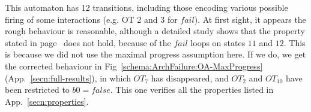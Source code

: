 \documentclass{llncs}
\newcommand{\tupleDeli}{(}
\newcommand{\tupleDelii}{)}
\newcommand{\setTupleDelims}[2][(]{
  \renewcommand{\tupleDeli}{#1}%
  \ifx#2\relax\else\renewcommand{\tupleDelii}{#2}\fi%
}
\newcommand{\tuplebase}[2][\ensuremath{,\allowbreak}]{%
  \def\nextitem{\def\nextitem{#1}}%
  \renewcommand*{\do}[1]{\nextitem ##1}%
  \tupleDeli\docsvlist{#2}\tupleDelii%
}
\newcommand{\tuple}[2][\ensuremath{,\allowbreak}]{%
  \setTupleDelims[(]{)}%
  \tuplebase[#1]{#2}%
}
\newcommand{\listset}[2][\ensuremath{,\allowbreak}]{%
  \setTupleDelims[\{]{\}}%
  \tuplebase[#1]{#2}%
}
\newcommand{\app}[1]{App.~\ref{secn:#1}}
\newcommand{\cC}{\ensuremath{\mathcal{C}}}
\newcommand{\ie}[1][\ ]{i.e.#1}
\newcommand{\export}[1][]{\ensuremath{\varepsilon_{#1}}}
\begin{document}
This automaton has 12 transitions, including those encoding various
possible firing of some interactions (e.g. OT 2 and 3 for
$fail$). At first sight, it appears the rough behaviour is
reasonable, although a detailed study shows that the property stated
in page~\pageref{property:reset} does not hold, because of the
$fail$ loops on states $11$ and $12$. This is because we did not use
the maximal progress assumption here. If we do, we get the corrected
behaviour in Fig~\ref{schema:ArchFailure:OA-MaxProgress}
(\app{full-results}), in which $OT_7$ has 
disappeared, and $OT_2$ and $OT_{10}$ have been restricted to
$b0=false$. This one verifies all the properties listed in
\app{properties}. 






\end{document}
